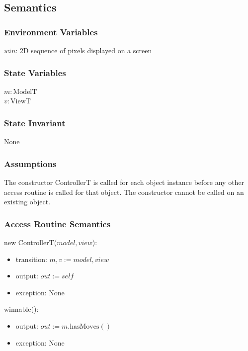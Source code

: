\documentclass[12pt]{article}
\begin{document}
\subsection* {Semantics}

\subsubsection* {Environment Variables}

$win$: 2D sequence of pixels displayed on a screen

\subsubsection* {State Variables}

$m: \mbox{ModelT}$\\
$v: \mbox{ViewT}$

\subsubsection* {State Invariant}

None

\subsubsection* {Assumptions}

The constructor ControllerT is called for each object instance before any other
access routine is called for that object.  The constructor cannot be called on
an existing object.

\subsubsection* {Access Routine Semantics}

new ControllerT($model, view$):
\begin{itemize}
	\item transition: $m, v := model, view$
	\item output: $out := \mathit{self}$
	\item exception: None
\end{itemize}

\noindent winnable():
\begin{itemize}
	\item output: $out := m.\mbox{hasMoves}()$
	\item exception: None
\end{itemize}
\end{document}
